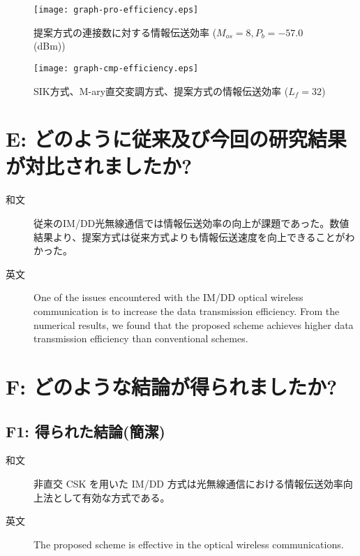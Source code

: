 ﻿\documentclass[a4j,10pt]{jarticle}
\begin{document}
\begin{figure}[hpbt]
\begin{center}
  \texttt{[image: graph-pro-efficiency.eps]}
\caption{提案方式の連接数に対する情報伝送効率 
($M_{os} = 8, P_{b}=-57.0$ (dBm))}
\label{fig:graph-proposal-efficiency}
\end{center}
\end{figure}
%
\begin{figure}[hpbt]
\begin{center}
  \texttt{[image: graph-cmp-efficiency.eps]}
\caption{SIK方式、M-ary直交変調方式、提案方式の情報伝送効率
($L_{f} = 32$)}
\label{fig:graph-cmp-efficiency}
\end{center}
\end{figure}
%
\section{E: どのように従来及び今回の研究結果が対比されましたか?} %
\begin{description} 
 \item[和文] 従来のIM/DD光無線通信では情報伝送効率の向上が課題であった。数値結果より、提案方式は従来方式よりも情報伝送速度を向上できることがわかった。
 \item[英文] One of the issues encountered with the IM/DD optical wireless communication is to increase the data transmission efficiency. From the numerical results, we found that the proposed scheme achieves higher data transmission efficiency than conventional schemes. 
\end{description}
%
\section{F: どのような結論が得られましたか?}
\subsection{F1: 得られた結論(簡潔)} %
\begin{description}
 \item[和文] 非直交 CSK を用いた IM/DD 方式は光無線通信における情報伝送効率向上法として有効な方式である。
%
 \item[英文] The proposed scheme is effective in the optical wireless communications. 
\end{description}
%
\end{document}
